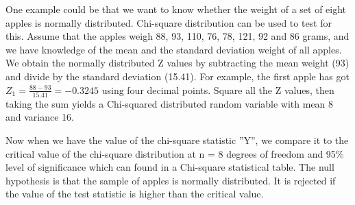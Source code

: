 One example could be that we want to know whether the weight of a set of eight apples is normally distributed. Chi-square distribution can be used to test for this. Assume that the apples weigh 88, 93, 110, 76, 78, 121, 92 and 86 grams, and we have knowledge of the mean and the standard deviation weight of all apples. We obtain the normally distributed Z values by subtracting the mean weight (93) and divide by the standard deviation (15.41). For example, the first apple has got $Z_1 = \frac{88-93}{15.41} = -0.3245$ using four decimal points. Square all the  Z values, then taking the sum yields a Chi-squared distributed random variable with mean 8 and variance 16.

Now when we have the value of the chi-square statistic ''Y'', we compare it to the critical value of the chi-square distribution at n = 8 degrees of freedom and 95\% level of significance which can found in a Chi-square statistical table. The null hypothesis is that the sample of apples is normally distributed. It is rejected if the value of the test statistic is higher than the critical value.
